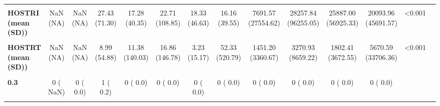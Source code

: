 \documentclass[
]{article}
\begin{document}
\begin{table}[H]
\begin{tabular}[t]{>{\raggedright\arraybackslash}p{5em}ccccccccccccc}
\textbf{\cellcolor{gray!10}{HOSTIE = YES (\%)}} & \cellcolor{gray!10}{0 (  NaN)} & \cellcolor{gray!10}{531 ( 81.2)} & \cellcolor{gray!10}{687 ( 71.6)} & \cellcolor{gray!10}{773 ( 79.5)} & \cellcolor{gray!10}{746 ( 73.6)} & \cellcolor{gray!10}{702 ( 76.4)} & \cellcolor{gray!10}{888 ( 69.4)} & \cellcolor{gray!10}{654 ( 76.0)} & \cellcolor{gray!10}{493 ( 82.4)} & \cellcolor{gray!10}{719 ( 86.2)} & \cellcolor{gray!10}{649 ( 79.9)} & \cellcolor{gray!10}{NaN} & \cellcolor{gray!10}{}\\
\textbf{HOSTRI (mean (SD))} & NaN (NA) & NaN (NA) & 27.43 (71.30) & 17.28 (40.35) & 22.71 (108.85) & 18.33 (46.63) & 16.16 (39.55) & 7691.57 (27554.62) & 28257.84 (96255.05) & 25887.00 (56925.33) & 20093.96 (45691.57) & <0.001 & \\
\textbf{\cellcolor{gray!10}{HOSTRO = YES (\%)}} & \cellcolor{gray!10}{158 ( 59.6)} & \cellcolor{gray!10}{793 ( 79.6)} & \cellcolor{gray!10}{1108 ( 75.9)} & \cellcolor{gray!10}{1309 ( 78.1)} & \cellcolor{gray!10}{1223 ( 76.1)} & \cellcolor{gray!10}{1358 ( 79.1)} & \cellcolor{gray!10}{1556 ( 83.9)} & \cellcolor{gray!10}{1557 ( 91.3)} & \cellcolor{gray!10}{1530 ( 95.7)} & \cellcolor{gray!10}{1473 ( 92.8)} & \cellcolor{gray!10}{1203 ( 88.1)} & \cellcolor{gray!10}{<0.001} & \cellcolor{gray!10}{}\\
\textbf{HOSTRT (mean (SD))} & NaN (NA) & NaN (NA) & 8.99 (54.88) & 11.38 (140.03) & 16.86 (146.78) & 3.23 (15.17) & 52.33 (520.79) & 1451.20 (3360.67) & 3270.93 (8659.22) & 1802.41 (3672.55) & 5670.59 (33706.36) & <0.001 & \\
\textbf{\cellcolor{gray!10}{HOSTTE (\%)}} & \cellcolor{gray!10}{} & \cellcolor{gray!10}{} & \cellcolor{gray!10}{} & \cellcolor{gray!10}{} & \cellcolor{gray!10}{} & \cellcolor{gray!10}{} & \cellcolor{gray!10}{} & \cellcolor{gray!10}{} & \cellcolor{gray!10}{} & \cellcolor{gray!10}{} & \cellcolor{gray!10}{} & \cellcolor{gray!10}{NaN} & \cellcolor{gray!10}{}\\
\textbf{0.3} & 0 (  NaN) & 0 (  0.0) & 1 (  0.2) & 0 (  0.0) & 0 (  0.0) & 0 (  0.0) & 0 (  0.0) & 0 (  0.0) & 0 (  0.0) & 0 (  0.0) & 0 (  0.0) &  & \\
\textbf{\cellcolor{gray!10}{NO}} & \cellcolor{gray!10}{0 (  NaN)} & \cellcolor{gray!10}{109 ( 27.9)} & \cellcolor{gray!10}{202 ( 32.1)} & \cellcolor{gray!10}{179 ( 24.9)} & \cellcolor{gray!10}{150 ( 23.3)} & \cellcolor{gray!10}{234 ( 25.7)} & \cellcolor{gray!10}{399 ( 36.9)} & \cellcolor{gray!10}{91 (  9.1)} & \cellcolor{gray!10}{82 (  7.3)} & \cellcolor{gray!10}{115 ( 13.2)} & \cellcolor{gray!10}{163 ( 22.7)} & \cellcolor{gray!10}{} & \cellcolor{gray!10}{}\\

\end{tabular}
\end{table}
\end{document}
